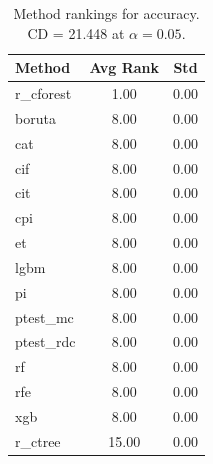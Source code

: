 \begin{table}[h]
\centering
\caption{Method rankings for accuracy. CD = 21.448 at $\alpha=0.05$.}
\label{tab:ranks_accuracy}
\begin{tabular}{lcc}
\toprule
Method & Avg Rank & Std \\
\midrule
r_cforest & 1.00 & 0.00 \\
boruta & 8.00 & 0.00 \\
cat & 8.00 & 0.00 \\
cif & 8.00 & 0.00 \\
cit & 8.00 & 0.00 \\
cpi & 8.00 & 0.00 \\
et & 8.00 & 0.00 \\
lgbm & 8.00 & 0.00 \\
pi & 8.00 & 0.00 \\
ptest_mc & 8.00 & 0.00 \\
ptest_rdc & 8.00 & 0.00 \\
rf & 8.00 & 0.00 \\
rfe & 8.00 & 0.00 \\
xgb & 8.00 & 0.00 \\
r_ctree & 15.00 & 0.00 \\
\bottomrule
\end{tabular}
\end{table}